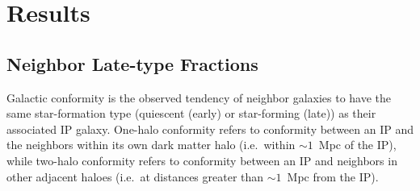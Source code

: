 
\section{Results}\label{sec:results}


\subsection{Neighbor Late-type Fractions}\label{sec:LTfraction}

Galactic conformity is the observed tendency of neighbor galaxies to have the same star-formation type (quiescent (early) or star-forming (late)) as their associated IP galaxy.
One-halo conformity refers to conformity between an IP and the neighbors within its own dark matter halo (i.e.~within $\sim1$~Mpc of the IP),
while two-halo conformity refers to conformity between an IP and neighbors in other adjacent haloes (i.e.~at distances greater than $\sim1$~Mpc from the IP).

